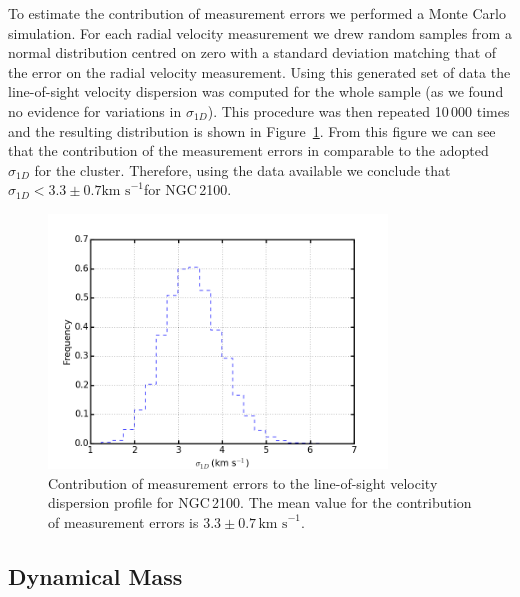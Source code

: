 \documentclass[useAMS,usenatbib]{mn2e}
\def\kms{$\mbox{km s}^{-1}$}
\begin{document}
To estimate the contribution of measurement errors we performed a Monte Carlo simulation.
For each radial velocity measurement we drew random samples from a normal distribution centred on zero with a standard deviation matching that of the error on the radial velocity measurement.
Using this generated set of data the line-of-sight velocity dispersion was computed for the whole sample (as we found no evidence for variations in $\sigma_{1D}$).
This procedure was then repeated 10\,000 times and the resulting distribution is shown in Figure~\ref{fig:errs}.
From this figure we can see that the contribution of the measurement errors in comparable to the adopted $\sigma_{1D}$ for the cluster.
Therefore, using the data available we conclude that $\sigma_{1D} < 3.3\pm0.7$\kms for NGC\,2100.




\begin{figure}
 \includegraphics[width=9.0cm]{NGC2100-errors}
 \caption{Contribution of measurement errors to the line-of-sight velocity dispersion profile for NGC\,2100.
 The mean value for the contribution of measurement errors is $3.3\pm0.7\,$\kms.
\label{fig:errs}
          }
\end{figure}



\subsection{Dynamical Mass} %
\label{sub:dynamical_mass}
\end{document}
